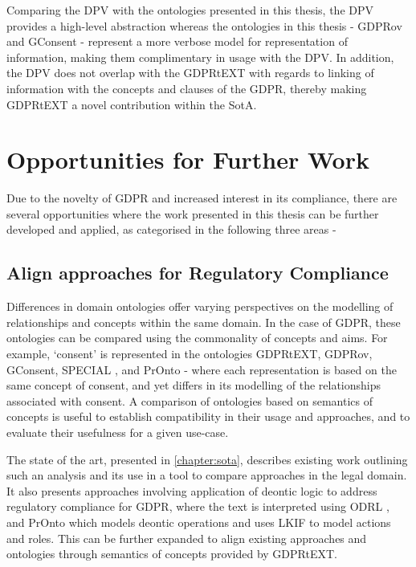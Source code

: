 Comparing the DPV with the ontologies presented in this thesis, the DPV provides a high-level abstraction whereas the ontologies in this thesis - GDPRov and GConsent - represent a more verbose model for representation of information, making them complimentary in usage with the DPV.
In addition, the DPV does not overlap with the GDPRtEXT with regards to linking of information with the concepts and clauses of the GDPR, thereby making GDPRtEXT a novel contribution within the SotA.

\section{Opportunities for Further Work}\label{sec:conclusion-future-work}
Due to the novelty of GDPR and increased interest in its compliance, there are several opportunities where the work presented in this thesis can be further developed and applied, as categorised in the following three areas -
\subsection*{Align approaches for Regulatory Compliance}
Differences in domain ontologies offer varying perspectives on the modelling of relationships and concepts within the same domain. In the case of GDPR, these ontologies can be compared using the commonality of concepts and aims. For example, `consent' is represented in the ontologies GDPRtEXT, GDPRov, GConsent, SPECIAL \cite{kirrane_scalable_2018}, and PrOnto \cite{palmirani_pronto:_2018} - where each representation is based on the same concept of consent, and yet differs in its modelling of the relationships associated with consent. A comparison of ontologies based on semantics of concepts is useful to establish compatibility in their usage and approaches, and to evaluate their usefulness for a given use-case.

The state of the art, presented in \autoref{chapter:sota}, describes existing work outlining such an analysis \cite{leone_taking_2019} and its use in a tool \cite{leone_legal_2018} to compare approaches in the legal domain. It also presents approaches involving application of deontic logic to address regulatory compliance for GDPR, where the text is interpreted using ODRL \cite{agarwal_legislative_2018}, and  PrOnto \cite{palmirani_pronto:_2018} which models deontic operations and uses LKIF \cite{hoekstra_lkif_2007} to model actions and roles.
This can be further expanded to align existing approaches and ontologies through semantics of concepts provided by GDPRtEXT.

